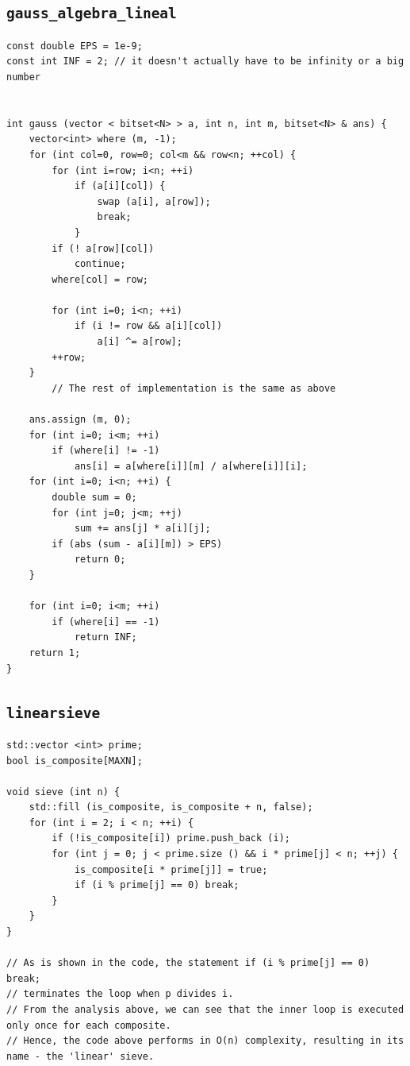 \subsection{\texttt{gauss\_algebra\_lineal}}
\begin{lstlisting}
const double EPS = 1e-9;
const int INF = 2; // it doesn't actually have to be infinity or a big number


int gauss (vector < bitset<N> > a, int n, int m, bitset<N> & ans) {
    vector<int> where (m, -1);
    for (int col=0, row=0; col<m && row<n; ++col) {
        for (int i=row; i<n; ++i)
            if (a[i][col]) {
                swap (a[i], a[row]);
                break;
            }
        if (! a[row][col])
            continue;
        where[col] = row;

        for (int i=0; i<n; ++i)
            if (i != row && a[i][col])
                a[i] ^= a[row];
        ++row;
    }
        // The rest of implementation is the same as above

    ans.assign (m, 0);
    for (int i=0; i<m; ++i)
        if (where[i] != -1)
            ans[i] = a[where[i]][m] / a[where[i]][i];
    for (int i=0; i<n; ++i) {
        double sum = 0;
        for (int j=0; j<m; ++j)
            sum += ans[j] * a[i][j];
        if (abs (sum - a[i][m]) > EPS)
            return 0;
    }

    for (int i=0; i<m; ++i)
        if (where[i] == -1)
            return INF;
    return 1;
}\end{lstlisting}

\subsection{\texttt{linearsieve}}
\begin{lstlisting}
std::vector <int> prime;
bool is_composite[MAXN];

void sieve (int n) {
	std::fill (is_composite, is_composite + n, false);
	for (int i = 2; i < n; ++i) {
		if (!is_composite[i]) prime.push_back (i);
		for (int j = 0; j < prime.size () && i * prime[j] < n; ++j) {
			is_composite[i * prime[j]] = true;
			if (i % prime[j] == 0) break;
		}
	}
}

// As is shown in the code, the statement if (i % prime[j] == 0) break; 
// terminates the loop when p divides i. 
// From the analysis above, we can see that the inner loop is executed only once for each composite. 
// Hence, the code above performs in O(n) complexity, resulting in its name - the 'linear' sieve.\end{lstlisting}

